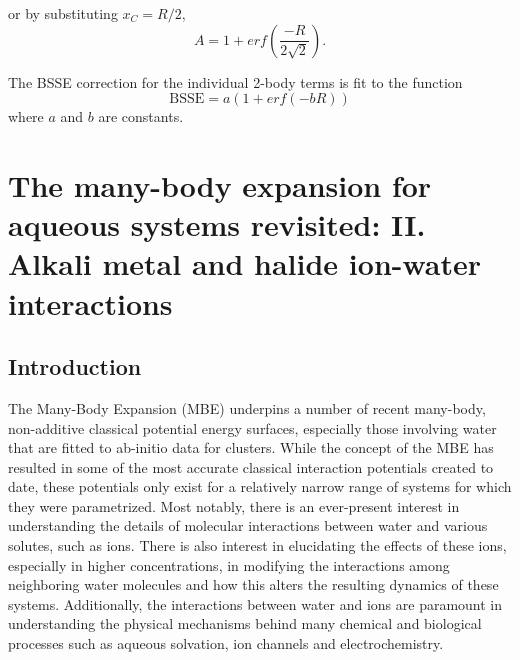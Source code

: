 \documentclass[11pt, proquest]{uwthesis}[2020/02/24]
\begin{document}
or by substituting $x_C=R/2$,
\begin{equation}\label{eq:MBE_I_1}
    A=1+erf\left(\frac{-R}{2\sqrt{2}}\right).
\end{equation}

The BSSE correction for the individual 2-body terms is fit to the function
\begin{equation}\label{eq:MBE_I_2}
    \mathrm{BSSE}=a(1+erf(-bR))
\end{equation}
where $a$ and $b$ are constants.


\chapter{The many-body expansion for aqueous systems revisited: II. Alkali metal and halide ion-water interactions}

\section{Introduction}
\par The Many-Body Expansion (MBE) underpins a number of recent many-body, non-additive classical potential energy surfaces, especially those involving water\autocite{burnham_development_2002,fanourgakis_flexible_2006,fanourgakis_development_2008,heindel_benchmark_2018,wang_flexible_2011,babin_development_2013,das_development_2019,gora_predictions_2014} that are fitted to ab-initio data for clusters. While the concept of the MBE has resulted in some of the most accurate classical interaction potentials created to date, these potentials only exist for a relatively narrow range of systems for which they were parametrized. Most notably, there is an ever-present interest in understanding the details of molecular interactions between water and various solutes, such as ions. There is also interest in elucidating the effects of these ions, especially in higher concentrations, in modifying the interactions among neighboring water molecules and how this alters the resulting dynamics of these systems. Additionally, the interactions between water and ions are paramount in understanding the physical mechanisms behind many chemical and biological processes such as aqueous solvation\autocite{makarov_solvation_2002,collins_ions_2004}, ion channels\autocite{pinto_influenza_1992,shearman_modulation_1989} and electrochemistry.\autocite{zhang_effects_2011,liu_doping_2006,tang_dynamic_2011}
\end{document}
